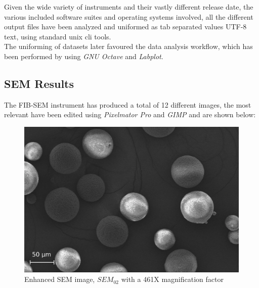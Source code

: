 \documentclass{article}
\begin{document}
      Given the wide variety of instruments and their vastly different release date, the various included software suites and operating systems involved,
      all the different output files have been analyzed and uniformed as tab separated values UTF-8 text, using standard unix cli tools. \\ 
      
      The uniforming of datasets later favoured the data analysis workflow, which has been performed by using \textit{GNU Octave} and \textit{Labplot}. \\

      \subsection{SEM Results\label{SEM_analysis_results}}

                
      The FIB-SEM instrument has produced a total of 12 different images, the most relevant have been edited using 
      \textit{Pixelmator Pro} and \textit{GIMP} and are shown below: \\


          \begin{figure}[ht]
              \centering 
              \includegraphics[width=\textwidth]{Pictures/SEM/Edited/04_02.eps}
              \caption{Enhanced SEM image, $SEM_{02}$ with a 461X magnification factor}
              \label{fig:SEM_02}
          \end{figure}
\end{document}
